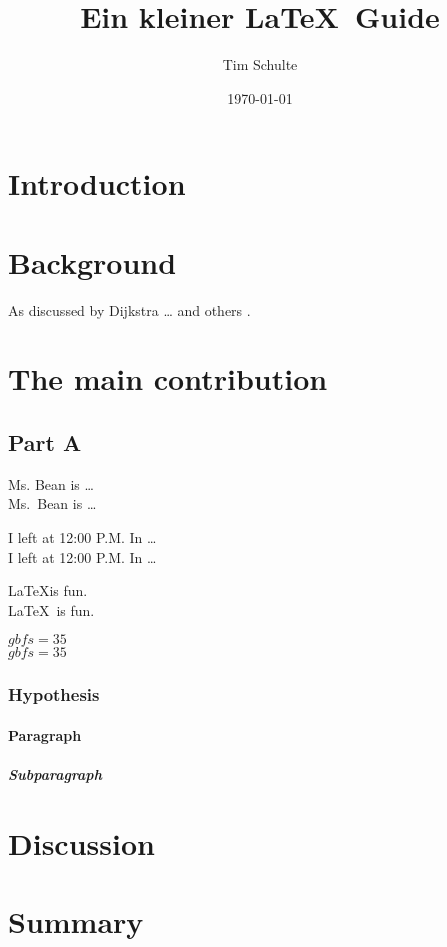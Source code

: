 \documentclass[titlepage]{article}
\title{Ein kleiner \LaTeX\ Guide}
\author{Tim Schulte}
\date{\today}
\begin{document}
\maketitle

\begin{abstract}

\end{abstract}

\section{Introduction}

\section{Background}
As discussed by Dijkstra \cite{dijkstra}\dots
and others \cite{nasheq,stackelberg}.

\section[Contribution]{The main contribution}

\subsection{Part A}

    Ms. Bean is \ldots\\
    Ms.\ Bean is \ldots

    I left at 12:00 P.M. In \ldots\\
    I left at 12:00 P.M\@. In \ldots

    \LaTeX is fun.\\
    \LaTeX\ is fun.


    $gbfs = 35$\\$\mathit{gbfs} = 35$

\subsubsection{Hypothesis}

\paragraph{Paragraph}

\subparagraph{Subparagraph}

\section{Discussion}

\section{Summary}
\printbibliography
\end{document}

